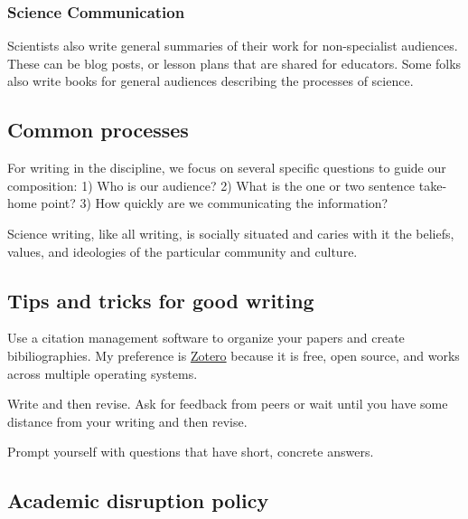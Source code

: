 \documentclass[11pt,]{article}
\begin{document}
\hypertarget{science-communication}{%
\subsubsection{Science Communication}\label{science-communication}}

Scientists also write general summaries of their work for non-specialist
audiences. These can be blog posts, or lesson plans that are shared for
educators. Some folks also write books for general audiences describing
the processes of science.

\hypertarget{common-processes}{%
\subsection{Common processes}\label{common-processes}}

For writing in the discipline, we focus on several specific questions to
guide our composition: 1) Who is our audience? 2) What is the one or two
sentence take-home point? 3) How quickly are we communicating the
information?

Science writing, like all writing, is socially situated and caries with
it the beliefs, values, and ideologies of the particular community and
culture.

\hypertarget{tips-and-tricks-for-good-writing}{%
\subsection{Tips and tricks for good
writing}\label{tips-and-tricks-for-good-writing}}

Use a citation management software to organize your papers and create
bibiliographies. My preference is \href{https://www.zotero.org/}{Zotero}
because it is free, open source, and works across multiple operating
systems.

Write and then revise. Ask for feedback from peers or wait until you
have some distance from your writing and then revise.

Prompt yourself with questions that have short, concrete answers.

\hypertarget{academic-disruption-policy}{%
\subsection{Academic disruption
policy}\label{academic-disruption-policy}}
\end{document}
